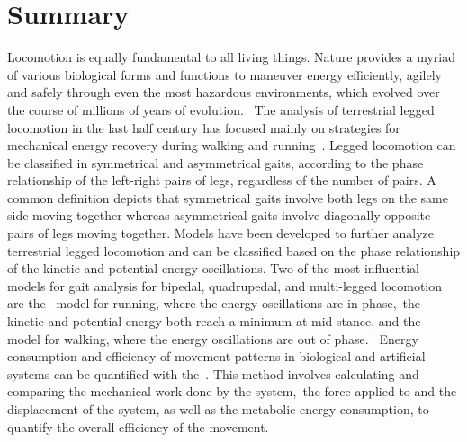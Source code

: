 %
%

\section{Summary}

Locomotion is equally fundamental to all living things. Nature provides a myriad of various biological forms and functions to maneuver energy efficiently, agilely and safely through even the most hazardous environments, which evolved over the course of millions of years of evolution.~\cite{Lee2018} The analysis of terrestrial legged locomotion in the last half century has focused mainly on strategies for mechanical energy recovery during walking and running~\cite{Lee2011}. Legged locomotion can be classified in symmetrical and asymmetrical gaits, according to the phase relationship of the left-right pairs of legs, regardless of the number of pairs. A common definition depicts that symmetrical gaits involve both legs on the same side moving together whereas asymmetrical gaits involve diagonally opposite pairs of legs moving together. Models have been developed to further analyze terrestrial legged locomotion and can be classified based on the phase relationship of the kinetic and potential energy oscillations. Two of the most influential models for gait analysis for bipedal, quadrupedal, and multi-legged locomotion are the~ model for running, where the energy oscillations are in phase,~\ie the kinetic and potential energy both reach a minimum at mid-stance, and the~ model for walking, where the energy oscillations are out of phase.~\cite{Lee2018} Energy consumption and efficiency of movement patterns in biological and artificial systems can be quantified with the~. This method involves calculating and comparing the mechanical work done by the system,~\ie the force applied to and the displacement of the system, as well as the metabolic energy consumption, to quantify the overall efficiency of the movement.~\cite{Biewener2018}
